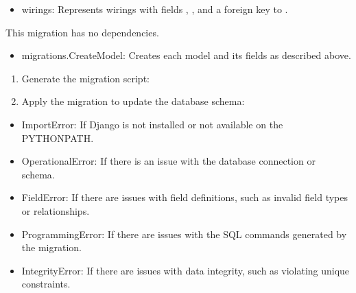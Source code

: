 \documentclass[letterpaper,10pt,english]{sphinxmanual}
\begin{document}
\begin{fulllineitems}
\begin{description}
\begin{itemize}
\item {} 
\sphinxAtStartPar
wirings: Represents wirings with fields , , and a foreign key to .

\end{itemize}

\sphinxAtStartPar
This migration has no dependencies.

\begin{itemize}
\item {} 
\sphinxAtStartPar
migrations.CreateModel: Creates each model and its fields as described above.

\end{itemize}

\begin{enumerate}
%
\item {} 
\sphinxAtStartPar
Generate the migration script:

\item {} 
\sphinxAtStartPar
Apply the migration to update the database schema:

\end{enumerate}

\begin{itemize}
\item {} 
\sphinxAtStartPar
ImportError: If Django is not installed or not available on the PYTHONPATH.

\item {} 
\sphinxAtStartPar
OperationalError: If there is an issue with the database connection or schema.

\item {} 
\sphinxAtStartPar
FieldError: If there are issues with field definitions, such as invalid field types or relationships.

\item {} 
\sphinxAtStartPar
ProgrammingError: If there are issues with the SQL commands generated by the migration.

\item {} 
\sphinxAtStartPar
IntegrityError: If there are issues with data integrity, such as violating unique constraints.


\end{itemize}
\end{description}
\end{fulllineitems}
\end{document}
